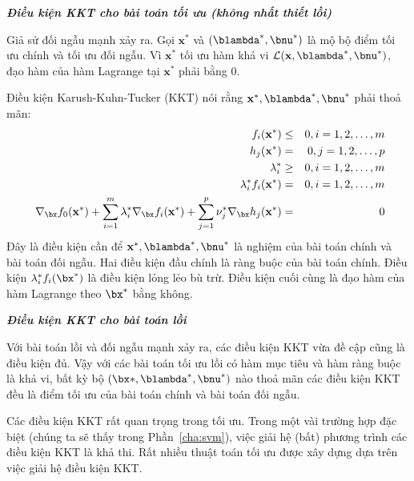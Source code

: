  
\textit{\textbf{Điều kiện KKT cho bài toán tối ưu (không nhất thiết lồi)}}

Giả sử đối ngẫu mạnh xảy ra. Gọi $\mathbf{x}^*$ và $(\blambda^*, \bnu^*)$ là mộ bộ điểm tối ưu chính và tối ưu đối ngẫu. Vì $\mathbf{x}^*$ tối ưu hàm khả vi $\mathcal{L}(\mathbf{x}, \blambda^*, \bnu^*)$, đạo hàm của hàm Lagrange tại $\mathbf{x}^*$ phải bằng 0.  
 
Điều kiện Karush-Kuhn-Tucker (KKT) nói rằng $\mathbf{x}^*, \blambda^*, \bnu^*$
phải thoả mãn:
\begin{eqnarray} 
    f_i(\mathbf{x}^*) &\leq& 0, i = 1, 2, \dots, m \\\ 
    h_j(\mathbf{x}^*) &=& 0, j = 1, 2, \dots, p \\\ 
    \lambda_i^* &\geq& 0, i = 1, 2, \dots, m \\\ 
    \lambda_i^*f_i(\mathbf{x}^*) &=& 0, i = 1, 2, \dots, m \\\ 
    \nabla_{\bx} f_0(\mathbf{x}^*) + \sum_{i=1}^m \lambda_i^* \nabla_{\bx} f_i(\mathbf{x}^*) + \sum_{j=1}^p\nu_j^* \nabla_{\bx} h_j(\mathbf{x}^*) &=& 0  
\end{eqnarray} 
Đây là {điều kiện cần} để $\mathbf{x}^*, \blambda^*, \bnu^*$ là nghiệm
của bài toán chính và bài toán đối ngẫu. Hai điều kiện đầu chính là ràng buộc của bài toán chính. Điều kiện $\lambda_i^*f_i(\bx^*)$ là điều kiện lỏng lẻo bù trừ. Điều kiện cuối cùng là đạo hàm của hàm Lagrange theo $\bx^*$ bằng không. 
 
 
\textit{\textbf{Điều kiện KKT cho bài toán lồi}}

Với bài toán lồi và đối ngẫu mạnh xảy ra, các điều kiện KKT vừa đề cập cũng là điều kiện đủ. Vậy với các bài toán tối ưu lồi có hàm mục tiêu và
hàm ràng buộc là khả vi, bất kỳ bộ $(\bx*, \blambda^*, \bnu^*)$ nào thoả mãn các
điều kiện KKT đều là điểm tối ưu của bài toán chính và bài toán đối ngẫu.

 
Các điều kiện KKT rất quan trọng trong tối ưu. Trong một vài trường hợp đặc biệt
(chúng ta sẽ thấy trong Phần~\ref{cha:svm}), việc giải hệ (bất) phương
trình các điều kiện KKT là khả thi. Rất nhiều thuật toán tối ưu được xây
dựng dựa trên việc giải hệ điều kiện KKT.
 
